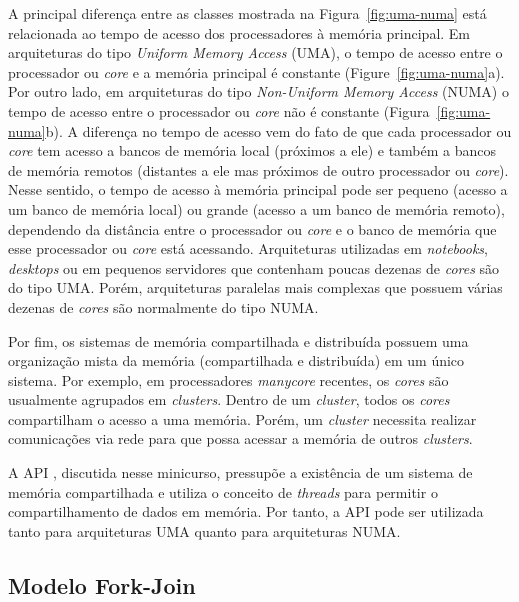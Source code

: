 \documentclass{SBCbookchapter}
\begin{document}
                	 A principal diferença entre as classes mostrada na Figura~\ref{fig:uma-numa}
	 	está relacionada ao tempo de acesso dos processadores à memória principal.
		Em arquiteturas do tipo \textit{Uniform Memory Access} (UMA), o tempo
                	de acesso entre o processador ou \textit{core} e a memória principal
                	é constante (Figure~\ref{fig:uma-numa}a).  Por outro lado, em
                	arquiteturas do tipo \textit{Non-Uniform Memory Access} (NUMA) o
                	tempo de acesso entre o processador ou \textit{core} não é constante
                	(Figura~\ref{fig:uma-numa}b). A diferença no tempo de acesso vem do
                	fato de que cada processador ou \textit{core} tem acesso a bancos de
                	memória local (próximos a ele) e também a bancos de memória remotos
                	(distantes a ele mas próximos de outro processador ou
                	\textit{core}). Nesse sentido, o tempo de acesso à memória principal
                	pode ser pequeno (acesso a um banco de memória local) ou grande
                	(acesso a um banco de memória remoto), dependendo da distância entre
                	o processador ou \textit{core} e o banco de memória que esse
                	processador ou \textit{core} está acessando.  Arquiteturas
                	utilizadas em \textit{notebooks}, \textit{desktops} ou em pequenos
                	servidores que contenham poucas dezenas de \textit{cores} são do
                	tipo UMA. Porém, arquiteturas paralelas mais complexas que possuem
                	várias dezenas de \textit{cores} são normalmente do tipo NUMA.

		Por fim, os sistemas de memória compartilhada e distribuída possuem uma organização
		mista da memória (compartilhada e distribuída) em um único sistema. Por exemplo, em
		processadores \textit{manycore} recentes, os \textit{cores} são usualmente agrupados em
		\textit{clusters}. Dentro de um \textit{cluster}, todos os \textit{cores} compartilham o acesso
		a uma memória. Porém, um \textit{cluster} necessita realizar comunicações via rede para
		que possa acessar a memória de outros \textit{clusters}.
		
		A API \openmp, discutida nesse minicurso, pressupõe a existência de um sistema de
		memória compartilhada e utiliza o conceito de \textit{threads} para permitir o
		compartilhamento de dados em memória. Por tanto, a API pode ser utilizada tanto
		para arquiteturas UMA quanto para arquiteturas NUMA.
		
	\subsection{Modelo Fork-Join}
\end{document}
